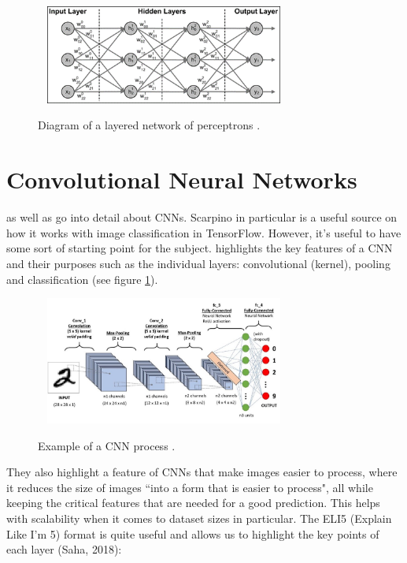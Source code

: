 \documentclass[12pt,a4paper]{report}
\begin{document}
\begin{figure}[h]\
    \centering
    \includegraphics[width=0.7\textwidth]{network.png}
    \caption{Diagram of a layered network of perceptrons \citep{ScarpinoMatthew2018Tfd}.}
\end{figure}

\section{Convolutional Neural Networks}
\label{subsec:cnn}

\citet{goodfellow2016deep} as well as \citet{ScarpinoMatthew2018Tfd} go into detail about CNNs. Scarpino in particular is a
useful source on how it works with image classification in TensorFlow. However, it's useful to have 
some sort of starting point for the subject. \citet{saha2018} highlights the key features of a CNN and their
purposes such as the individual layers: convolutional (kernel),  pooling and classification (see figure \ref{fig:cnnSimple}).

\begin{figure}[h]\
    \centering
    \includegraphics[width=0.7\textwidth]{saha.jpg}
    \caption{Example of a CNN process \citep{saha2018}.}
    \label{fig:cnnSimple}
\end{figure}

They also highlight a feature of CNNs that make images easier to process, where it reduces the size of images “into a 
form that is easier to process", all while keeping the critical features that are needed for a good prediction. This helps 
with scalability when it comes to dataset sizes in particular. The ELI5 (Explain Like I'm 5) format is 
quite useful and allows us to highlight the key points of each layer (Saha, 2018):
\end{document}
